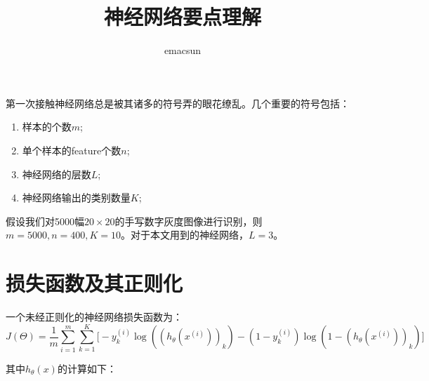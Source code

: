 \documentclass[10pt,a4paper,UTF8]{article}
\author{emacsun}
\date{}
\title{神经网络要点理解}
\begin{document}
\maketitle
\tableofcontents
{}
第一次接触神经网络总是被其诸多的符号弄的眼花缭乱。几个重要的符号包括：

\begin{enumerate}
\item 样本的个数\(m\);
\item 单个样本的feature个数\(n\);
\item 神经网络的层数\(L\);
\item 神经网络输出的类别数量\(K\);
\end{enumerate}

假设我们对5000幅\(20\times 20\)的手写数字灰度图像进行识别，则\(m=5000,n=400,K=10\)。对于本文用到的神经网络，\(L=3\)。

\section{损失函数及其正则化}
\label{sec:orgf18f3ff}
一个未经正则化的神经网络损失函数为：
\begin{equation}
\label{eq:1}
J(\Theta) = \frac{1}{m} \sum_{i=1}^{m} \sum_{k=1}^{K} \big[ - y_{k}^{(i)}\log ((h_{\theta}(x^{(i)}))_{k}) - (1-y_{k}^{(i)})\log (1- (h_{\theta}(x^{(i)}))_{k} ) \big]
\end{equation}

其中\(h_{\theta}(x)\)的计算如下：
\end{document}
